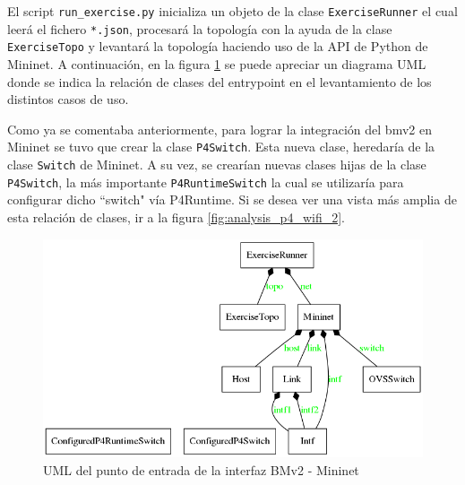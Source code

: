 El script \texttt{run\_exercise.py} inicializa un objeto de la clase \texttt{ExerciseRunner} el cual leerá el fichero \texttt{*.json}, procesará la topología con la ayuda de la clase \texttt{ExerciseTopo} y levantará la topología haciendo uso de la API de Python de Mininet. A continuación, en la figura \ref{fig:analysis_p4_wifi_1} se puede apreciar un diagrama UML donde se indica la relación de clases del entrypoint en el levantamiento de los distintos casos de uso.\\
\par

Como ya se comentaba anteriormente, para lograr la integración del \gls{bmv2} en Mininet se tuvo que crear la clase \texttt{P4Switch}. Esta nueva clase, heredaría de la clase \texttt{Switch} de Mininet. A su vez, se crearían nuevas clases hijas de la clase \texttt{P4Switch}, la más importante \texttt{P4RuntimeSwitch} la cual se utilizaría para configurar dicho ``switch" vía P4Runtime. Si se desea ver una vista más amplia de esta relación de clases, ir a la figura \ref{fig:analysis_p4_wifi_2}.

\newpage

\begin{figure}[ht]
    \centering
    \includegraphics[width=13cm]{archivos/img/dev/p4-wifi/analysis/run_exercise_pertenencia.png}
    \caption{UML del punto de entrada de la interfaz BMv2 - Mininet}
    \label{fig:analysis_p4_wifi_1}
\end{figure}

